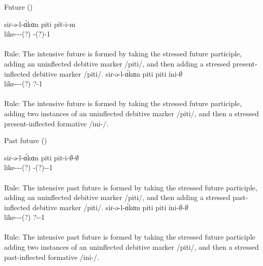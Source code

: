 \begin{exe}
\begin{xlist}
\begin{xlist}
\end{xlist}
		\ex Future ()
		\begin{xlist}
			\ex 		\gll 
			siɾ-ə-l-\'ɑkɑn piti p\'it-i-m \\ 
			like-{\thgloss}-{\infgloss}-{\futcvb}(?) {\deb} {\deb}-{\thgloss}(?)-1{\sg}\\ 
			\trans {} \\
			Rule: The intensive future is formed by taking the stressed future participle, adding an uninflected debitive marker /piti/, and then adding a stressed present-inflected debitive marker /piti/. 
			\ex \gll 
			siɾ-ə-l-\'ɑkɑn piti piti \'ini-$\emptyset$ \\ 
			like-{\thgloss}-{\infgloss}-{\futcvb}(?) {\deb} {\deb} {?}-1{\sg}\\ 
			\trans {} \\
			Rule: The intensive future is formed by taking the stressed future participle, adding two instances of an uninflected debitive marker /piti/, and then a stressed present-inflected formative /ini-/. 
		\end{xlist}

		\ex Past future (\armenian{անցեալ ապառնի}) 
\begin{xlist}
	\ex \gll 
	siɾ-ə-l-\'ɑkɑn piti pit-i-$\emptyset$-$\emptyset$ \\ 
	like-{\thgloss}-{\infgloss}-{\futcvb}(?) {\deb} {\deb}-{\thgloss}(?)-{\pst}-1{\sg} \\ 
	\trans {} \\
	Rule: The intensive past future is formed by taking the stressed future participle, adding an uninflected debitive marker /piti/, and then adding a stressed past-inflected debitive marker /piti/. 
	\ex   \gll 
	siɾ-ə-l-\'ɑkɑn piti piti \'ini-$\emptyset$-$\emptyset$ \\ 
	like-{\thgloss}-{\infgloss}-{\futcvb}(?) {\deb} {\deb} {?}-{\pst}-1{\sg} \\ 
	\trans {} \\
	Rule: The intensive past future is formed by taking the stressed future participle adding two instances of an uninflected debitive marker /piti/, and then a stressed past-inflected formative /ini-/. 
	
\end{xlist}
		
	\end{xlist}
	
	
\end{exe}


